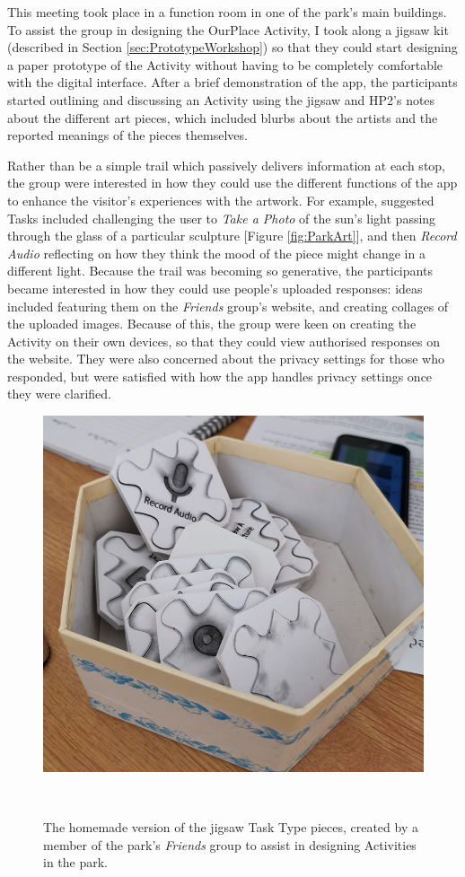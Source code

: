 This meeting took place in a function room in one of the park's main buildings. To assist the group in designing the OurPlace Activity, I took along a jigsaw kit (described in Section \ref{sec:PrototypeWorkshop}) so that they could start designing a paper prototype of the Activity without having to be completely comfortable with the digital interface. After a brief demonstration of the app, the participants started outlining and discussing an Activity using the jigsaw and HP2's notes about the different art pieces, which included blurbs about the artists and the reported meanings of the pieces themselves. 

Rather than be a simple trail which passively delivers information at each stop, the group were interested in how they could use the different functions of the app to enhance the visitor's experiences with the artwork. For example, suggested Tasks included challenging the user to \textit{Take a Photo} of the sun's light passing through the glass of a particular sculpture [Figure \ref{fig:ParkArt}], and then \textit{Record Audio} reflecting on how they think the mood of the piece might change in a different light. Because the trail was becoming so generative, the participants became interested in how they could use people's uploaded responses: ideas included featuring them on the \textit{Friends} group's website, and creating collages of the uploaded images. Because of this, the group were keen on creating the Activity on their own devices, so that they could view authorised responses on the website. They were also concerned about the privacy settings for those who responded, but were satisfied with how the app handles privacy settings once they were clarified.

\begin{figure}
  \centering
  \includegraphics[width=0.65\columnwidth]{images/chapter06/DIY_jigsaws.jpg}
  \caption[Homemade jigsaw pieces created by a \textit{Friends} of the park group member.]{The homemade version of the jigsaw Task Type pieces, created by a member of the park's \textit{Friends} group to assist in designing Activities in the park.}~\label{fig:DIYJigsaw}
\end{figure}

